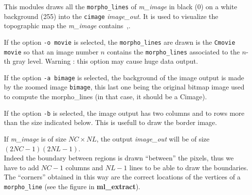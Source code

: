 This modules draws all the {\tt morpho\_lines} of {\em m\_image} in
black (0) on a white background (255) into  the
{\tt cimage} {\em image\_out}.
It is used to visualize the topographic map the
{\em m\_image} contains~\cite{caselles.coll.ea:kanizsa},\cite{caselles.coll.ea:topographic}.

If the option \verb+-o movie+ is selected, the {\tt morpho\_lines}
are drawn is the {\tt Cmovie} \verb+movie+ so that an image number
$n$ contains the {\tt morpho\_lines} associated to the $n$-th 
gray level. Warning : this option may cause huge data output.

If the option \verb+-a bimage+ is selected, the background of the
image output is made by the zoomed image \verb+bimage+, this last
one being the original bitmap image used to compute the morpho\_lines
(in that case, it should be a Cimage).

If the option \verb+-b+ is selected, the image output has two columns
and to rows more than the size indicated below. This is usefull to
draw the border image. 

\smallskip

If {\em m\_image} is of size $NC\times NL$, 
the output {\em image\_out} will be of size $(2NC-1)(2NL-1)$.\\
Indeed the boundary between regions is drawn ``between'' the pixels,
thus we have to add $NC-1$ columns and $NL-1$ lines to be able
to draw the boundaries. \\
The ``corners'' obtained in this way are the correct locations
of the vertices of a {\tt morpho\_line} (see the figure in
{\bf ml\_extract}).